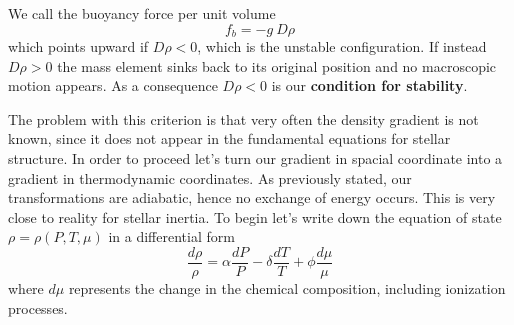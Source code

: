We call the buoyancy force per unit volume 
$$
f_b=- g \ D \rho
$$
which points upward if $D \rho < 0$, which is the unstable configuration. If instead $D \rho > 0$ the mass element sinks back to its original position and no macroscopic motion appears. As a consequence $D \rho<0$ is our \textbf{condition for stability}.

The problem with this criterion is that very often the density gradient is not known, since it does not appear in the fundamental equations for stellar structure. In order to proceed let's turn our gradient in spacial coordinate into a gradient in thermodynamic coordinates. As previously stated, our transformations are adiabatic, hence no exchange of energy occurs. This is very close to reality for stellar inertia. To begin let's write down the equation of state $\rho = \rho (P, T, \mu)$ in a differential form
\begin{equation}\label{eq:EoSdiff}
	\frac{d \rho}{\rho} = \alpha \frac{d P}{P} - \delta \frac{d T}{T} + \phi \frac{d \mu}{\mu}
\end{equation}
where $d \mu$ represents the change in the chemical composition, including ionization processes. 

